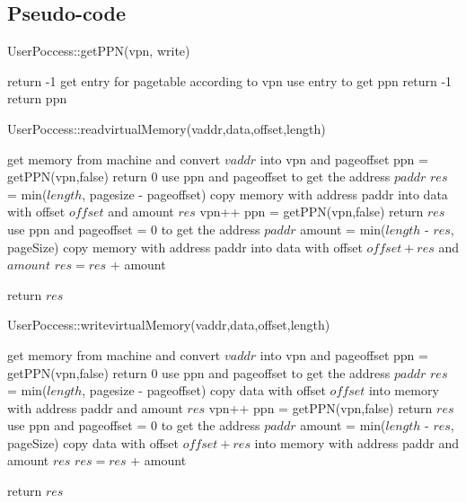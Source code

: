 \documentclass[a4paper,10pt]{article}
\begin{document}
\subsection{Pseudo-code}

\begin{algorithm}
\caption{UserPoccess::getPPN(vpn, write)}
      {
           return -1\;
      }
get entry for pagetable according to vpn\;
use entry to get ppn\;
      {
           return -1\;
      }
return ppn\;
\end{algorithm}

\begin{algorithm}
\caption{UserPoccess::readvirtualMemory(vaddr,data,offset,length)}
get memory from machine and convert $vaddr$ into vpn and pageoffset\;
ppn = getPPN(vpn,false)\;
      {
           return 0\;
      }
use ppn and pageoffset to get the address $paddr$\;
$res$ = min($length$, pagesize - pageoffset)\;
copy memory with address paddr into data with offset $offset$ and amount $res$\;
 {
    vpn++\;
    ppn = getPPN(vpn,false)\;
      {
           return $res$\;
      }
    use ppn and pageoffset = 0 to get the address $paddr$\;
    amount = min($length$ - $res$, pageSize)\;
   copy memory with address paddr into data with offset $offset + res$ and $amount$\;
   $res = res$ + amount\;
 }

return $res$\;
\end{algorithm}

\begin{algorithm}
\caption{UserPoccess::writevirtualMemory(vaddr,data,offset,length)}
get memory from machine and convert $vaddr$ into vpn and pageoffset\;
ppn = getPPN(vpn,false)\;
      {
           return 0\;
      }
use ppn and pageoffset to get the address $paddr$\;
$res$ = min($length$, pagesize - pageoffset)\;
copy data with offset $offset$ into memory with address paddr and amount $res$\;
 {
    vpn++\;
    ppn = getPPN(vpn,false)\;
      {
           return $res$\;
      }
    use ppn and pageoffset = 0 to get the address $paddr$\;
    amount = min($length$ - $res$, pageSize)\;
    copy data with offset $offset + res$ into memory with address paddr and amount $res$\;
   $res = res$ + amount\;
 }

return $res$\;
\end{algorithm}
\end{document}

